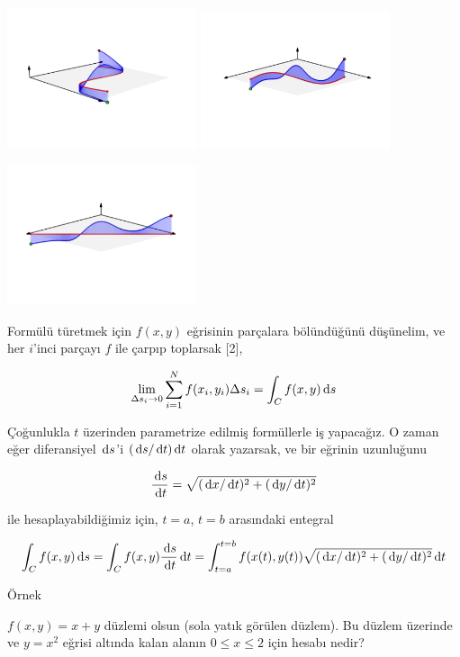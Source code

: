 \documentclass[12pt,fleqn]{article}\usepackage{../../common}
\begin{document}
\includegraphics[width=15em]{19_line_ex1_05.png}
\includegraphics[width=15em]{19_line_ex1_06.png}

\includegraphics[width=15em]{19_line_ex1_07.png}

Formülü türetmek için $f(x,y)$ eğrisinin parçalara bölündüğünü düşünelim,
ve her $i$'inci parçayı $f$ ile çarpıp toplarsak [2], 

$$
\lim_{\Delta s_i \to 0} \sum_{i=1}^{N} f(x_i,y_i) \Delta s_i = \int_C f(x,y) 
\,\mathrm{d} s
$$

Çoğunlukla $t$ üzerinden parametrize edilmiş formüllerle iş yapacağız. O
zaman eğer diferansiyel $\,\mathrm{d} s$'i $(\,\mathrm{d} s/ \,\mathrm{d} t) \,\mathrm{d} t$ olarak yazarsak,
ve bir eğrinin uzunluğunu

$$
\frac{\,\mathrm{d} s}{\,\mathrm{d} t} = \sqrt{(\,\mathrm{d} x/\,\mathrm{d} t)^2 + (\,\mathrm{d} y/\,\mathrm{d} t)^2} 
$$
 
ile hesaplayabildiğimiz için, $t=a$, $t=b$ arasındaki entegral

$$
\int_C f(x,y) \,\mathrm{d} s = 
\int_C f(x,y) \frac{\,\mathrm{d} s}{\,\mathrm{d} t} \,\mathrm{d} t = 
\int_{t=a}^{t=b} f(x(t),y(t)) \sqrt{(\,\mathrm{d} x/\,\mathrm{d} t)^2 + (\,\mathrm{d} y/\,\mathrm{d} t)^2} \,\mathrm{d} t
$$


Örnek

$f(x,y) = x + y$ düzlemi olsun (sola yatık görülen düzlem). Bu düzlem
üzerinde ve $y = x^2$ eğrisi altında kalan alanın $0 \le x \le 2$ için
hesabı nedir?
\end{document}
